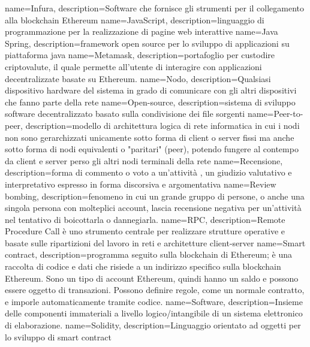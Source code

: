  { name={Infura}, description={Software che fornisce gli strumenti per il collegamento alla blockchain Ethereum} }
 { name={JavaScript}, description={linguaggio di programmazione per la realizzazione di pagine web interattive} }
 { name={Java Spring}, description={framework open source per lo sviluppo di applicazioni su piattaforma java} }
 { name={Metamask}, description={portafoglio per custodire criptovalute, il quale permette all'utente di interagire con applicazioni decentralizzate basate su Ethereum.} }
 { name={Nodo}, description={Qualsiasi dispositivo hardware del sistema in grado di comunicare con gli altri dispositivi che fanno parte della rete} }
 { name={Open-source}, description={sistema di sviluppo software decentralizzato basato sulla condivisione dei file sorgenti} }
 { name={Peer-to-peer}, description={modello di architettura logica di rete informatica in cui i nodi non sono gerarchizzati unicamente sotto forma di client o server fissi ma anche sotto forma di nodi equivalenti o "paritari" (peer), potendo fungere al contempo da client e server perso gli altri nodi terminali della rete} }
 { name={Recensione}, description={forma di commento o voto a un'attività , un giudizio valutativo e interpretativo espresso in forma discorsiva e argomentativa} }
 { name={Review bombing}, description={fenomeno in cui un grande gruppo di persone, o anche una singola persona con molteplici account, lascia recensione negativa per un'attività nel tentativo di boicottarla o dannegiarla.} }
 { name={RPC}, description={Remote Procedure Call è uno strumento centrale per realizzare strutture operative e basate sulle ripartizioni del lavoro in reti e architetture client-server} }
 { name={Smart contract}, description={programma seguito sulla blockchain di Ethereum; è una raccolta di codice e dati che risiede a un indirizzo specifico sulla blockchain Ethereum. Sono un tipo di account Ethereum, quindi hanno un saldo e possono essere oggetto di transazioni. Possono definire regole, come un normale contratto, e imporle automaticamente tramite codice.} }
 { name={Software}, description={Insieme delle componenti immateriali a livello logico/intangibile di un sistema elettronico di elaborazione.} }
 { name={Solidity}, description={Linguaggio orientato ad oggetti per lo sviluppo di smart contract} }

